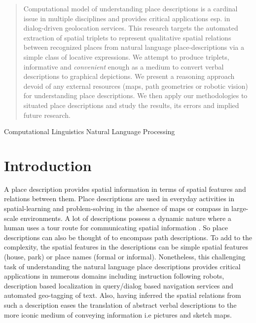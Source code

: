 \documentclass{acm_proc_article-sp}
\begin{document}
\maketitle
\begin{abstract}
Computational model of understanding place descriptions is a cardinal issue in multiple disciplines and provides critical applications esp. in dialog-driven geolocation services. This research targets the automated extraction of spatial triplets to represent qualitative spatial relations between recognized places from 
natural language place-descriptions via a simple class of locative expressions. We attempt to produce triplets, informative and \textit{convenient} enough as a medium to convert verbal descriptions to graphical depictions. We present a reasoning approach devoid of any external resources (maps, path geometries or robotic vision) for understanding place descriptions. We then apply our methodologies to situated place descriptions and study the results, its errors and implied future research.
\end{abstract}

Computational Linguistics
Natural Language Processing



\section{Introduction}
A place description provides spatial information in terms of spatial features and relations between them. Place descriptions are used in everyday activities in spatial-learning and problem-solving in the absence of maps or compass in large-scale environments. A lot of descriptions possess a dynamic nature where a human uses a tour route for communicating spatial information \cite{linde:spatial}. So place descriptions can also be thought of to encompass path descriptions. To add to the complexity, the spatial features in the descriptions can be simple spatial features (house, park) or place names (formal or informal). Nonetheless, this challenging task of understanding the natural language place descriptions provides critical applications in numerous domains including instruction following robots, description based localization in query/dialog based navigation services and automated geo-tagging of text. Also, having inferred the spatial relations from such a description eases the translation of abstract verbal descriptions to the more iconic medium of conveying information i.e pictures and sketch maps. 
\end{document}
